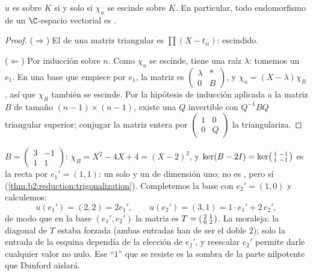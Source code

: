 \begin{theorem}[Trigonalización]\label{thm:b2:reduction:trigonalization}
$u$ es  sobre $K$ si y solo si $\chi_u$ se escinde
sobre $K$. En particular, todo endomorfismo de un $\C$-espacio
vectorial es .
\end{theorem}

\begin{proof}
($\Rightarrow$) El  de una matriz triangular
es $\prod(X - t_{ii})$: escindido.

($\Leftarrow$) Por inducción sobre $n$. Como $\chi_u$ se escinde,
tiene una raíz $\lambda$: tomemos un  $e_1$. En una
base que empiece por $e_1$, la matriz es $\begin{pmatrix} \lambda &
\ast\\ 0 & B\end{pmatrix}$, y $\chi_u = (X - \lambda)\chi_B$, así que
$\chi_B$ también se escinde. Por la hipótesis de inducción aplicada a
la matriz $B$ de tamaño $(n-1) \times (n-1)$, existe una $Q$
invertible con $Q^{-1}BQ$ triangular superior; conjugar la matriz
entera por $\begin{pmatrix}1 & 0\\ 0 & Q\end{pmatrix}$ la
triangulariza.
\end{proof}

\begin{example}\label{ex:b2:reduction:trigwork}
$B = \begin{pmatrix}3 & -1\\ 1 & 1\end{pmatrix}$: $\chi_B = X^2 -
4X + 4 = (X - 2)^2$, y $\ker(B - 2I) = \ker\begin{psmallmatrix}1 &
-1\\ 1 & -1\end{psmallmatrix}$ es la recta  por $e_1' = (1,
1)$: un solo  y un  de dimensión
uno; no es , pero sí 
(\cref{thm:b2:reduction:trigonalization}). Completemos la base con
$e_2' = (1, 0)$ y calculemos:
\[
u(e_1') = (2, 2) = 2e_1',
\qquad
u(e_2') = (3, 1) = 1\cdot e_1' + 2\, e_2' ,
\]
de modo que en la base $(e_1', e_2')$ la matriz es $T =
\begin{psmallmatrix}2 & 1\\ 0 & 2\end{psmallmatrix}$. La moraleja:
la diagonal de $T$ estaba forzada (ambas entradas han de ser el
 doble $2$); solo la entrada de la esquina dependía de
la elección de $e_2'$, y reescalar $e_2'$ permite darle cualquier
valor no nulo. Ese ``$1$'' que se resiste es la sombra de la parte
nilpotente que Dunford aislará.
\end{example}

